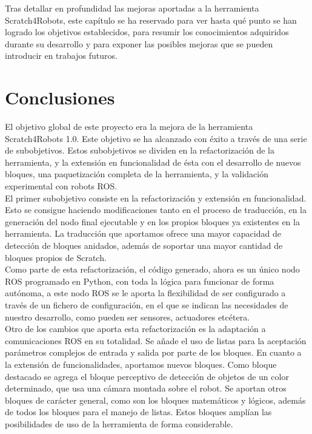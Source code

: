 Tras detallar en profundidad las mejoras aportadas a la herramienta Scratch4Robots,  este capítulo se ha reservado para ver hasta qué punto se han logrado los objetivos establecidos, para resumir los conocimientos adquiridos durante su desarrollo y para exponer las posibles mejoras que se pueden introducir en trabajos futuros.

\section{Conclusiones}
\label{sec:conclusiones}

El objetivo global de este proyecto era la mejora de la herramienta Scratch4Robots 1.0. Este objetivo se ha alcanzado con éxito a través de una serie de subobjetivos. Estos subobjetivos se dividen en la refactorización de la herramienta, y la extensión en funcionalidad de ésta con el desarrollo de nuevos bloques, una paquetización completa de la herramienta, y la validación experimental con robots ROS.\\

El primer subobjetivo consiste en la refactorización y extensión en funcionalidad. Esto se consigue haciendo modificaciones tanto en el proceso de traducción, en la generación del nodo final ejecutable y en los propios bloques ya existentes en la herramienta. La traducción que aportamos ofrece una mayor capacidad de detección de bloques anidados, además de soportar una mayor cantidad de bloques propios de Scratch. \\

Como parte de esta refactorización, el código generado, ahora es un único nodo ROS programado en Python, con toda la lógica para funcionar de forma autónoma, a este nodo ROS se le aporta la flexibilidad de ser configurado a través de un fichero de configuración, en el que se indican las necesidades de nuestro desarrollo, como pueden ser sensores, actuadores etcétera. \\

Otro de los cambios que aporta esta refactorización es la adaptación a comunicaciones ROS en su totalidad. Se añade el uso de listas para la aceptación parámetros complejos de entrada y salida por parte de los bloques. En cuanto a la extensión de funcionalidades, aportamos nuevos bloques. Como bloque destacado se agrega el bloque perceptivo de detección de objetos de un color determinado, que usa una cámara montada sobre el robot. Se aportan otros bloques de carácter general, como son los bloques matemáticos y lógicos, además de todos los bloques para el manejo de listas. Estos bloques amplían las posibilidades de uso de la herramienta de forma considerable.\\

